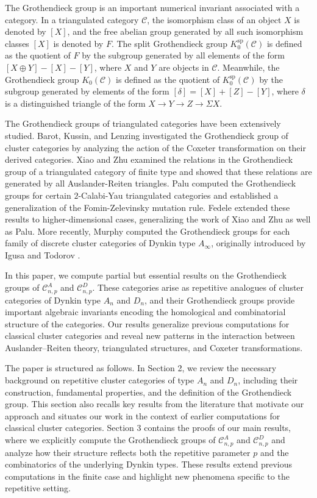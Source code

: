 \documentclass[a4paper,reqno,11pt]{amsart}
\theoremstyle{definition}
\def\C{\mathcal{C}}
\begin{document}
The Grothendieck group is an important numerical invariant associated with a category.
In a triangulated category $\C$, the isomorphism class of an object $X$ is denoted by $[X]$, and the free abelian group generated by all such isomorphism classes $[X]$ is denoted by $F$.
The split Grothendieck group $K_0^{\mathrm{sp}}(\C)$ is defined as the quotient of $F$ by the subgroup generated by all elements of the form $[X \oplus Y] - [X] - [Y]$, where $X$ and $Y$ are objects in $\C$.
Meanwhile, the Grothendieck group $K_0(\C)$ is defined as the quotient of $K_0^{\mathrm{sp}}(\C)$ by the subgroup generated by elements of the form $[\delta] = [X] + [Z] - [Y]$, where $\delta$ is a distinguished triangle of the form
  $X\rightarrow Y\rightarrow Z\rightarrow \Sigma X.$


The Grothendieck groups of triangulated categories have been extensively studied.
Barot, Kussin, and Lenzing \cite{BKL} investigated the Grothendieck group of cluster categories by analyzing the action of the Coxeter transformation on their derived categories.
Xiao and Zhu \cite{XZ} examined the relations in the Grothendieck group of a triangulated category of finite type and showed that these relations are generated by all Auslander-Reiten triangles.
Palu \cite{P} computed the Grothendieck groups for certain $2$-Calabi-Yau triangulated categories and established a generalization of the Fomin-Zelevinsky mutation rule.
Fedele \cite{F} extended these results to higher-dimensional cases, generalizing the work of Xiao and Zhu as well as Palu.
More recently, Murphy \cite{M} computed the Grothendieck groups for each family of discrete cluster categories of Dynkin type $A_{\infty}$, originally introduced by Igusa and Todorov \cite{IT}.



In this paper, we
compute partial but essential results on the Grothendieck groups of $\C_{n,p}^A$ and $\C_{n,p}^D$.
These categories arise as repetitive analogues of cluster categories of Dynkin type $A_n$ and $D_n$, and their Grothendieck groups provide important algebraic invariants encoding the homological and combinatorial structure of the categories.
Our results generalize previous computations for classical cluster categories and reveal new patterns in the interaction between Auslander–Reiten theory, triangulated structures, and Coxeter transformations.

The paper is structured as follows.
In Section 2, we review the necessary background on repetitive cluster categories of type $A_n$ and $D_n$, including their construction, fundamental properties, and the definition of the Grothendieck group. This section also recalls key results from the literature that motivate our approach and situates our work in the context of earlier computations for classical cluster categories.
Section 3 contains the proofs of our main results, where we explicitly compute the Grothendieck groups of $\C_{n,p}^A$ and $\C_{n,p}^D$ and analyze how their structure reflects both the repetitive parameter $p$ and the combinatorics of the underlying Dynkin types.
These results extend previous computations in the finite case and highlight new phenomena specific to the repetitive setting.
\end{document}
